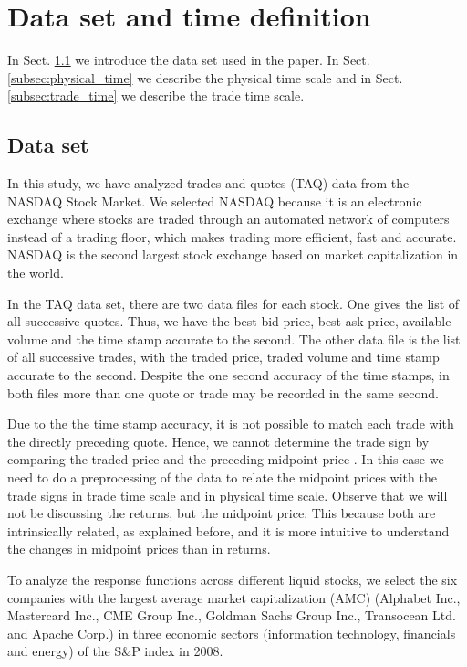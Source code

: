 \section{Data set and time definition}\label{sec:data_time}

In Sect. \ref{subsec:data_set} we introduce the data set used in the paper. In
Sect. \ref{subsec:physical_time} we describe the physical time scale and in
Sect. \ref{subsec:trade_time} we describe the trade time scale.

\subsection{Data set}\label{subsec:data_set}

In this study, we have analyzed trades and quotes (TAQ) data from the NASDAQ
Stock Market. We selected NASDAQ because it is an electronic exchange where
stocks are traded through an automated network of computers instead of a
trading floor, which makes trading more efficient, fast and accurate.
NASDAQ is the second largest stock exchange based on market capitalization in
the world.

In the TAQ data set, there are two data files for each stock. One gives the
list of all successive quotes. Thus, we have the best bid price, best ask price,
available volume and the time stamp accurate to the second. The other data file
is the list of all successive trades, with the traded price, traded volume and
time stamp accurate to the second. Despite the one second accuracy of the time
stamps, in both files more than one quote or trade may be recorded in the same
second.

Due to the the time stamp accuracy, it is not possible to match each trade with
the directly preceding quote. Hence, we cannot determine the trade sign by
comparing the traded price and the preceding midpoint price
\cite{Wang_2016_cross}. In this case we need to do a preprocessing of the data
to relate the midpoint prices with the trade signs in trade time scale and in
physical time scale. Observe that we will not be discussing the returns, but
the midpoint price. This because both are intrinsically related, as explained
before, and it is more intuitive to understand the changes in midpoint prices
than in returns.

To analyze the response functions across different liquid stocks, we select the
six companies with the largest average market capitalization (AMC) (Alphabet
Inc., Mastercard Inc., CME Group Inc., Goldman Sachs Group Inc., Transocean
Ltd. and Apache Corp.) in three economic sectors (information technology,
financials and energy) of the S\&P index in 2008.

